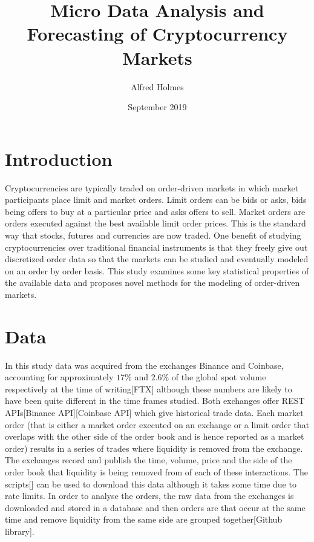 \documentclass[a4paper,10pt]{article}
\title{Micro Data Analysis and Forecasting of Cryptocurrency Markets}
\author{Alfred Holmes}
\date{September 2019}
\begin{document}
   \maketitle
\section{Introduction}
Cryptocurrencies are typically traded on order-driven markets in which market participants place limit and market orders. Limit orders can be bids or asks, bids being offers to buy at a particular price and asks offers to sell. Market orders are orders executed against the best available limit order prices. This is the standard way that stocks, futures and currencies are now traded. One benefit of studying cryptocurrencies over traditional financial instruments is that they freely give out discretized order data so that the markets can be studied and eventually modeled on an order by order basis. This study examines some key statistical properties of the available data and proposes novel methods for the modeling of order-driven markets.
\section{Data}
In this study data was acquired from the exchanges Binance and Coinbase, accounting for approximately $17\%$ and $2.6\%$ of the global spot volume respectively at the time of writing[FTX] although these numbers are likely to have been quite different in the time frames studied. Both exchanges offer REST APIs[Binance API][Coinbase API] which give historical trade data. Each market order (that is either a market order executed on an exchange or a limit order that overlaps with the other side of the order book and is hence reported as a market order) results in a series of trades where liquidity is removed from the exchange. The exchanges record and publish the time, volume, price and the side of the order book that liquidity is being removed from of each of these interactions. The scripts[] can be used to download this data although it takes some time due to rate limits. In order to analyse the orders, the raw data from the exchanges is downloaded and stored in a database and then orders are that occur at the same time and remove liquidity from the same side are grouped together[Github library].
\end{document}
